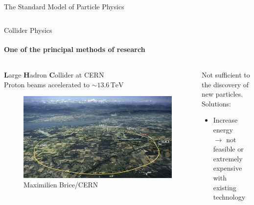 \begin{frame}{The Standard Model of Particle Physics}
\begin{columns}
\begin{column}{0.5 \textwidth}
      \vspace{0.5em}


      

    \end{column}

  \end{columns}

\end{frame}


\begin{frame} {Collider Physics}
  \framesubtitle{One of the principal methods of research}

   \begin{columns}
  
    \begin{column}{0.5\textwidth}
    \textbf{L}arge \textbf{H}adron \textbf{C}ollider at CERN \\
    Proton beams accelerated to $\sim 13.6 \, \text{TeV}$ \\

      \begin{figure}
        \centering
        \includegraphics[width=\textwidth]{imgs/lhc.jpeg}
        \caption{ Maximilien Brice/CERN}
      \end{figure}
    \end{column}


    \begin{column}{0.5\textwidth}
        \begin{centering}
            Not sufficient to the discovery of new particles. \\

            \vspace{2.0em}
        Solutions: 
        \vspace{0.8em}
        \begin{itemize}
        \item Increase energy \\$\to$ not feasible or extremely expensive\\ \quad with existing technology
        \end{itemize}
        \end{centering}


\end{column}
\end{columns}
\end{frame}
